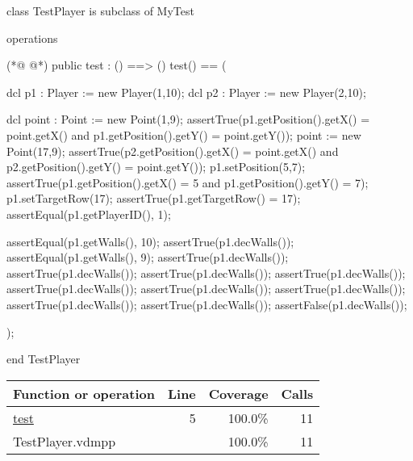 \begin{vdmpp}[breaklines=true]
class TestPlayer is subclass of MyTest

operations

(*@
\label{test:5}
@*)
 public test : () ==> ()
 test() == 
 (
 
  dcl p1 : Player := new Player(1,10);
  dcl p2 : Player := new Player(2,10);
  
  dcl point : Point := new Point(1,9);
  assertTrue(p1.getPosition().getX() = point.getX() and p1.getPosition().getY() = point.getY());
  point := new Point(17,9);
  assertTrue(p2.getPosition().getX() = point.getX() and p2.getPosition().getY() = point.getY());
  p1.setPosition(5,7);
  assertTrue(p1.getPosition().getX() = 5 and p1.getPosition().getY() = 7);
  p1.setTargetRow(17);
  assertTrue(p1.getTargetRow() = 17);
  assertEqual(p1.getPlayerID(), 1);
  
  assertEqual(p1.getWalls(), 10);
  assertTrue(p1.decWalls());
  assertEqual(p1.getWalls(), 9);
  assertTrue(p1.decWalls());
  assertTrue(p1.decWalls());
  assertTrue(p1.decWalls());
  assertTrue(p1.decWalls());
  assertTrue(p1.decWalls());
  assertTrue(p1.decWalls());
  assertTrue(p1.decWalls());
  assertTrue(p1.decWalls());
  assertTrue(p1.decWalls());
  assertFalse(p1.decWalls());
  
 );

end TestPlayer
\end{vdmpp}
\bigskip
\begin{longtable}{|l|r|r|r|}
\hline
Function or operation & Line & Coverage & Calls \\
\hline
\hline
\hyperref[test:5]{test} & 5&100.0\% & 11 \\
\hline
\hline
TestPlayer.vdmpp & & 100.0\% & 11 \\
\hline
\end{longtable}

